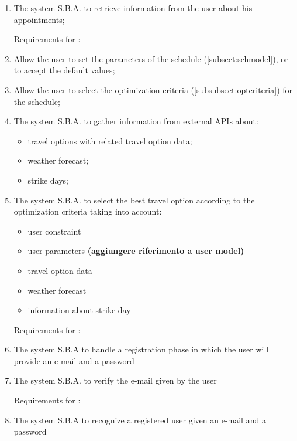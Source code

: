 \begin{enumerate}
\renewcommand\labelenumi{\textbf{R\theenumi}}

\item The system S.B.A. to retrieve information from the user about his appointments; \label{req:R1}

Requirements for :

\item Allow the user to set the parameters of the schedule (\ref{subsect:schmodel}), or to accept the default values;
 
\item Allow the user to select the optimization criteria (\ref{subsubsect:optcriteria}) for the schedule;

\item The system S.B.A. to gather information from external APIs about: 
\begin{itemize}
\item travel options with related travel option data;
\item weather forecast;
\item strike days;
\end{itemize}

\item The system S.B.A. to select the best travel option according to the optimization criteria taking into account:
\begin{itemize}
\item user constraint
\item user parameters \textbf{(aggiungere riferimento a user model)}
\item travel option data 
\item weather forecast
\item information about strike day
\end{itemize}

Requirements for :

\item The system S.B.A to handle a registration phase in which the user will provide an e-mail and a password

\item The system S.B.A. to verify the e-mail given by the user

Requirements for :
\item The system S.B.A to recognize a registered user given an e-mail and a password
\\


\end{enumerate}
